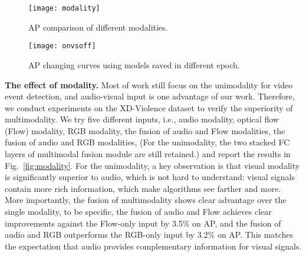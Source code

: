\documentclass[runningheads]{llncs}
\begin{document}
\begin{figure}[t]
\centering
\begin{minipage}[t]{0.48\textwidth}
\centering
\texttt{[image: modality]}
\caption{AP comparison of different modalities.}
\label{fig:modality}
\end{minipage}
\begin{minipage}[t]{0.48\textwidth}
\centering
\texttt{[image: onvsoff]}
\caption{ AP changing curves using models saved in different epoch.}
\label{fig:onvsoff}
\end{minipage}
\end{figure}

\textbf{The effect of modality.} Most of work still focus on the unimodality for video event detection, and audio-visual input is one advantage of our work. Therefore, we conduct experiments on the XD-Violence dataset to verify the superiority of multimodality. We try five different inputs, i.e., audio modality, optical flow (Flow) modality, RGB modality, the fusion of audio and Flow modalities, the fusion of audio and RGB modalities, (For the unimodality, the two stacked FC layers of multimodal fusion module are still retained.) and report the results in Fig.~\ref{fig:modality}. For the unimodality, a key observation is that visual modality is significantly superior to audio, which is not hard to understand: visual signals contain more rich information, which make algorithms see farther and more. More importantly, the fusion of multimodality shows clear advantage over the single modality, to be specific, the fusion of audio and Flow achieves clear improvements against the Flow-only input by 3.5\% on AP, and the fusion of audio and RGB outperforms the RGB-only input by 3.2\% on AP. This matches the expectation that audio provides complementary information for visual signals.\\
\end{document}
